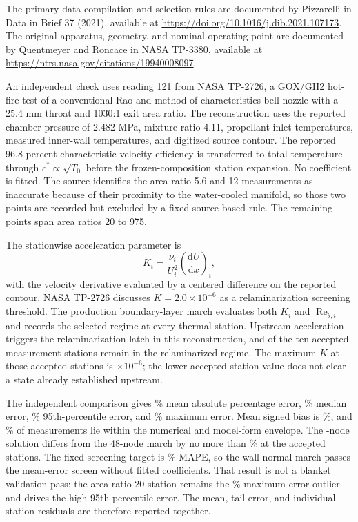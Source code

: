 \documentclass[11pt]{article}
\newcommand{\Rey}{\operatorname{Re}}
\begin{document}
The primary data compilation and selection rules are documented by Pizzarelli in Data in Brief 37 (2021), available at \url{https://doi.org/10.1016/j.dib.2021.107173}. The original apparatus, geometry, and nominal operating point are documented by Quentmeyer and Roncace in NASA TP-3380, available at \url{https://ntrs.nasa.gov/citations/19940008097}.

An independent check uses reading 121 from NASA TP-2726, a GOX/GH2 hot-fire test of a conventional Rao and method-of-characteristics bell nozzle with a 25.4 mm throat and 1030:1 exit area ratio. The reconstruction uses the reported chamber pressure of 2.482 MPa, mixture ratio 4.11, propellant inlet temperatures, measured inner-wall temperatures, and digitized source contour. The reported 96.8 percent characteristic-velocity efficiency is transferred to total temperature through $c^*\propto\sqrt{T_0}$ before the frozen-composition station expansion. No coefficient is fitted. The source identifies the area-ratio 5.6 and 12 measurements as inaccurate because of their proximity to the water-cooled manifold, so those two points are recorded but excluded by a fixed source-based rule. The remaining \BellThermalValidationCaseCount{} points span area ratios 20 to 975.

The stationwise acceleration parameter is
\begin{equation}
K_i=\frac{\nu_i}{U_i^2}\left(\frac{\mathrm{d}U}{\mathrm{d}x}\right)_i,
\label{eq:thermal-acceleration-parameter}
\end{equation}
with the velocity derivative evaluated by a centered difference on the reported contour. NASA TP-2726 discusses $K=2.0\times10^{-6}$ as a relaminarization screening threshold. The production boundary-layer march evaluates both $K_i$ and $\Rey_{\theta,i}$ and records the selected regime at every thermal station. Upstream acceleration triggers the relaminarization latch in this reconstruction, and \BellThermalValidationRelaminarizedCount{} of the ten accepted measurement stations remain in the relaminarized regime. The maximum $K$ at those accepted stations is \BellThermalValidationMaxK$\times10^{-6}$; the lower accepted-station value does not clear a state already established upstream.

The independent comparison gives \BellThermalValidationMeanError\% mean absolute percentage error, \BellThermalValidationMedianError\% median error, \BellThermalValidationNinetyFifthError\% 95th-percentile error, and \BellThermalValidationMaxError\% maximum error. Mean signed bias is \BellThermalValidationSignedBias\%, and \BellThermalValidationCoverage\% of measurements lie within the numerical and model-form envelope. The \BellThermalValidationWallNodes-node solution differs from the 48-node march by no more than \BellThermalValidationMaxGridError\% at the accepted stations. The fixed screening target is \BellThermalValidationTarget\% MAPE, so the wall-normal march passes the mean-error screen without fitted coefficients. That result is not a blanket validation pass: the area-ratio-20 station remains the \BellThermalValidationMaxError\% maximum-error outlier and drives the high 95th-percentile error. The mean, tail error, and individual station residuals are therefore reported together.
\end{document}
